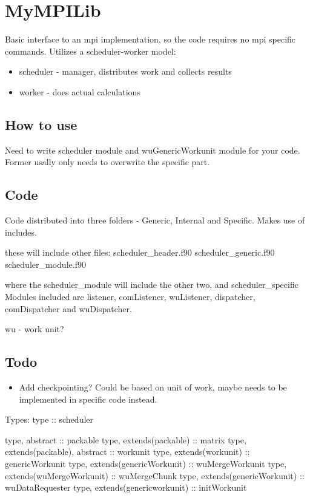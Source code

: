 \chapter{MyMPILib}
Basic interface to an mpi implementation, so the code requires no
mpi specific commands.
Utilizes a scheduler-worker model:
\begin{itemize}
  \item scheduler - manager, distributes work and collects results
  \item worker - does actual calculations
\end{itemize}

\section{How to use}
Need to write scheduler module and wuGenericWorkunit module for your
code.
Former usally only needs to overwrite the specific part.

\section{Code}
Code distributed into three folders - Generic, Internal and Specific.
Makes use of includes.

these will include other files:
scheduler\_header.f90
scheduler\_generic.f90
scheduler\_module.f90

where the scheduler\_module will include the other two, and scheduler\_specific
Modules included are listener, comListener, wuListener, dispatcher,
comDispatcher and wuDispatcher.

wu - work unit?

\section{Todo}
\begin{itemize}
  \item Add checkpointing? Could be based on unit of work, maybe needs
  to be implemented in specific code instead.
\end{itemize}


Types:
type :: scheduler

type, abstract :: packable
  type, extends(packable) :: matrix
  type, extends(packable), abstract :: workunit
    type, extends(workunit) :: genericWorkunit
      type, extends(genericWorkunit) :: wuMergeWorkunit
        type, extends(wuMergeWorkunit) :: wuMergeChunk
      type, extends(genericWorkunit) :: wuDataRequester
      type, extends(genericworkunit) :: initWorkunit

